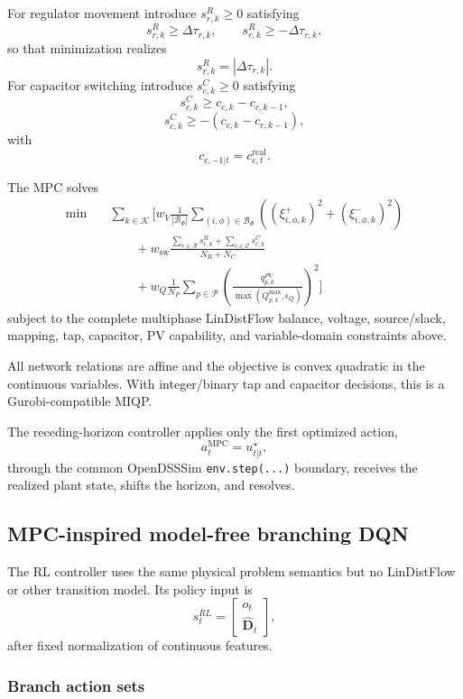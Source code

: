 For regulator movement introduce $s_{r,k}^{R}\ge0$ satisfying
\[
s_{r,k}^{R}
\ge
\Delta\tau_{r,k},
\qquad
s_{r,k}^{R}
\ge
-\Delta\tau_{r,k},
\]
so that minimization realizes
\[
s_{r,k}^{R}=|\Delta\tau_{r,k}|.
\]
For capacitor switching introduce $s_{c,k}^{C}\ge0$ satisfying
\[
s_{c,k}^{C}
\ge
c_{c,k}-c_{c,k-1},
\]
\[
s_{c,k}^{C}
\ge
-(c_{c,k}-c_{c,k-1}),
\]
with
\[
c_{c,-1|t}
=
c_{c,t}^{\mathrm{real}}.
\]

The MPC solves
\[
\boxed{
\begin{aligned}
\min\quad
&
\sum_{k\in\mathcal K}
\Bigg[
w_V
\frac{1}{|\mathcal B_\Phi|}
\sum_{(i,\phi)\in\mathcal B_\Phi}
\left(
(\xi_{i,\phi,k}^{+})^2
+
(\xi_{i,\phi,k}^{-})^2
\right)
\\
&\qquad
+
w_{\mathrm{sw}}
\frac{
\sum_{r\in\mathcal R}s_{r,k}^{R}
+
\sum_{c\in\mathcal C}s_{c,k}^{C}
}{
N_R+N_C
}
\\
&\qquad
+
w_Q
\frac{1}{N_P}
\sum_{p\in\mathcal P}
\left(
\frac{q_{p,k}^{PV}}
{\max(Q_{p,k}^{\max},\epsilon_Q)}
\right)^2
\Bigg]
\end{aligned}
}
\]
subject to the complete multiphase LinDistFlow balance, voltage, source/slack, mapping,
tap, capacitor, PV capability, and variable-domain constraints above.

All network relations are affine and the objective is convex quadratic in the continuous
variables.  With integer/binary tap and capacitor decisions, this is a
Gurobi-compatible MIQP.

The receding-horizon controller applies only the first optimized action,
\[
\boxed{
a_t^{\mathrm{MPC}}
=
u_{t|t}^{\star},
}
\]
through the common OpenDSSSim \texttt{env.step(...)} boundary, receives the realized plant
state, shifts the horizon, and resolves.

\subsection{MPC-inspired model-free branching DQN}
\label{subsec:p1_rl}

The RL controller uses the same physical problem semantics but no LinDistFlow or other
transition model.  Its policy input is
\[
s_t^{RL}
=
\begin{bmatrix}
o_t\\
\widehat{\mathbf D}_t
\end{bmatrix},
\]
after fixed normalization of continuous features.

\subsubsection{Branch action sets}

